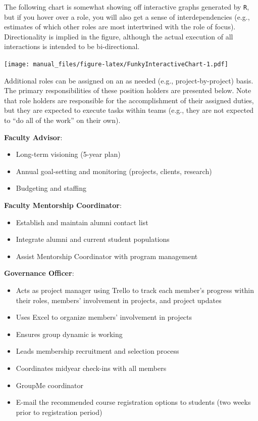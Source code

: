 \documentclass[
]{book}
\providecommand{\tightlist}{%
  \setlength{\itemsep}{0pt}\setlength{\parskip}{0pt}}
\begin{document}
The following chart is somewhat showing off interactive graphs generated by \texttt{R}, but if you hover over a role, you will also get a sense of interdependencies (e.g., estimates of which other roles are most intertwined with the role of focus). Directionality is implied in the figure, although the actual execution of all interactions is intended to be bi-directional.

\texttt{[image: manual\_files/figure-latex/FunkyInteractiveChart-1.pdf]}

Additional roles can be assigned on an as needed (e.g., project-by-project) basis. The primary responsibilities of these position holders are presented below. Note that role holders are responsible for the accomplishment of their assigned duties, but they are expected to execute tasks within teams (e.g., they are not expected to ``do all of the work'' on their own).

\textbf{Faculty Advisor}:

\begin{itemize}
\tightlist
\item
  Long-term visioning (5-year plan)
\item
  Annual goal-setting and monitoring (projects, clients, research)
\item
  Budgeting and staffing
\end{itemize}

\textbf{Faculty Mentorship Coordinator}:

\begin{itemize}
\tightlist
\item
  Establish and maintain alumni contact list\\
\item
  Integrate alumni and current student populations\\
\item
  Assist Mentorship Coordinator with program management
\end{itemize}

\textbf{Governance Officer}:

\begin{itemize}
\tightlist
\item
  Acts as project manager using Trello to track each member's progress within their roles, members' involvement in projects, and project updates
\item
  Uses Excel to organize members' involvement in projects
\item
  Ensures group dynamic is working
\item
  Leads membership recruitment and selection process\\
\item
  Coordinates midyear check-ins with all members
\item
  GroupMe coordinator
\item
  E-mail the recommended course registration options to students (two weeks prior to registration period)
\end{itemize}
\end{document}
